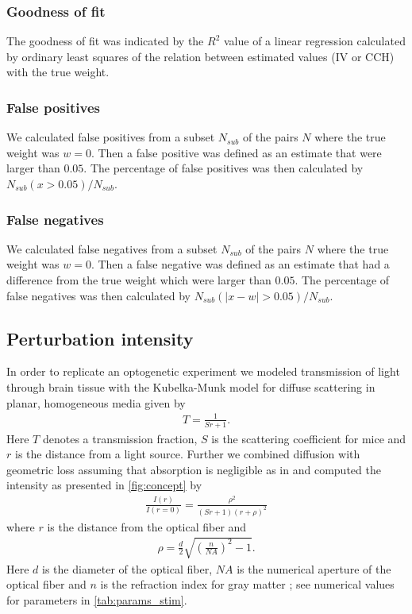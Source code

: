 \documentclass[11pt]{article}
\begin{document}
\subsubsection{Goodness of fit}
The goodness of fit was indicated by the $R^2$ value of a linear regression calculated by ordinary least squares \citep{seabold2010statsmodels} of the relation between estimated values (IV or CCH) with the true weight.

\subsubsection{False positives}
We calculated false positives from a subset $N_{sub}$ of the pairs $N$ where the true weight was $w = 0$. 
Then a false positive was defined as an estimate that were larger than $0.05$. 
The percentage of false positives was then calculated by $N_{sub}(x > 0.05) / N_{sub}$.

\subsubsection{False negatives}
We calculated false negatives from a subset $N_{sub}$ of the pairs $N$ where the true weight was $w = 0$.  
Then a false negative was defined as an estimate that had a difference from the true weight which were larger than $0.05$. 
The percentage of false negatives was then calculated by $N_{sub}(|x - w| > 0.05) / N_{sub}$.

\subsection{Perturbation intensity}\label{sec:method:opto}
In order to replicate an optogenetic experiment we modeled transmission of light through brain tissue with the Kubelka-Munk model for diffuse scattering in planar, homogeneous media \citep{Ho2017} given by
\begin{align}
T = \frac{1}{Sr + 1}.
\end{align}
Here $ T $ denotes a transmission fraction, $ S $ is the scattering coefficient for mice \citep{Aravanis2007} and $ r $ is the distance from a light source. 
Further we combined diffusion with geometric loss assuming that absorption is negligible as in \cite{Aravanis2007} and computed the intensity as presented in \cref{fig:concept} by
\begin{align}
\label{eq:intensity}
\frac{I(r)}{I(r=0)} = \frac{\rho^2}{(Sr + 1)(r + \rho)^2}
\end{align}
where $ r $ is the distance from the optical fiber and
\begin{align}
\rho = \frac{d}{2}\sqrt{\left(\frac{n}{NA}\right)^2 - 1}.
\end{align}
Here $ d $ is the diameter of the optical fiber, $ NA $ is the numerical aperture of the optical fiber and $ n $ is the refraction index for gray matter \citep{Ho2017}; see numerical values for parameters in \cref{tab:params_stim}.
\end{document}
